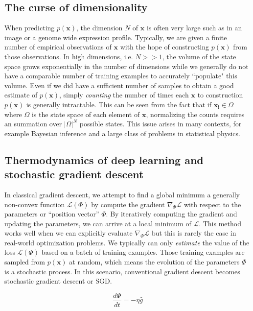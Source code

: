 \documentclass{article}
\begin{document}
\subsection{The curse of dimensionality}

When predicting $p(\mathbf{x})$, the dimension $N$ of $\mathbf{x}$ is often very large such as in an image or a genome wide expression profile. Typically, we are given a finite number of empirical observations of $\mathbf{x}$ with the hope of constructing $p(\mathbf{x})$ from those observations. In high dimensions, i.e. $N >> 1$, the volume of the state space grows exponentially in the number of dimensions while we generally do not have a comparable number of training examples to accurately ``populate" this volume. Even if we did have a sufficient number of samples to obtain a good estimate of $p(\mathbf{x})$, simply \emph{counting} the number of times each $\mathbf{x}$ to construction $p(\mathbf{x})$ is generally intractable. This can be seen from the fact that if $\mathbf{x_{i}}\in \Omega$ where $\Omega$ is the state space of each element of $\mathbf{x}$, normalizing the counts requires an summation over $|\Omega|^{N}$ possible states. This issue arises in many contexts, for example Bayesian inference and a large class of problems in statistical physics. 

\subsection{Thermodynamics of deep learning and stochastic gradient descent}

In classical gradient descent, we attempt to find a global minimum a generally non-convex function $\mathcal{L}(\Phi)$ by compute the gradient $\nabla_{\Phi} \mathcal{L}$ with respect to the parameters or ``position vector'' $\Phi$. By iteratively computing the gradient and updating the parameters, we can arrive at a local minimum of $\mathcal{L}$. This method works well when we can explicitly evaluate $\nabla_{\Phi} \mathcal{L}$ but this is rarely the case in real-world optimization problems. We typically can only \emph{estimate} the value of the loss $\mathcal{L}(\Phi)$ based on a batch of training examples. Those training examples are sampled from $p(\mathbf{x})$ at random, which means the evolution of the parameters $\Phi$ is a stochastic process. In this scenario, conventional gradient descent becomes stochastic gradient descent or SGD. 

\begin{equation*}
\frac{d\Phi}{dt} = - \eta \hat{g}
\end{equation*}
\end{document}
